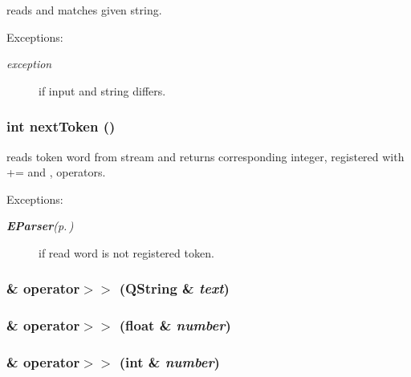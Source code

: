 reads and matches given string. \begin{Desc}
\item[Exceptions:]
\begin{description}
\item[{\em exception}]if input and string differs. \end{description}
\end{Desc}


\subsubsection{\setlength{\rightskip}{0pt plus 5cm}int next\-Token ()}\label{classParser_a4}


reads token word from stream and returns corresponding integer, registered with += and , operators. \begin{Desc}
\item[Exceptions:]
\begin{description}
\item[{\em {\bf EParser}{\rm (p.\,\pageref{classEParser})}}]if read word is not registered token. \end{description}
\end{Desc}


\subsubsection{ \& operator$>$$>$ (QString \& {\em text})}\label{classParser_a9}


\subsubsection{ \& operator$>$$>$ (float \& {\em number})}\label{classParser_a8}


\subsubsection{ \& operator$>$$>$ (int \& {\em number})}\label{classParser_a7}


